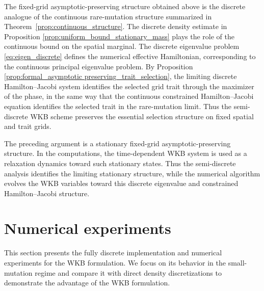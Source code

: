 \documentclass[11pt]{article}
\numberwithin{equation}{section}
\begin{document}
The fixed-grid asymptotic-preserving structure obtained above is the discrete analogue of the
continuous rare-mutation structure summarized in
Theorem~\ref{prop:continuous_structure}.  The discrete density estimate in Proposition \ref{prop:uniform_bound_stationary_mass}
plays the role of the continuous bound on the spatial marginal.  The discrete
eigenvalue problem \eqref{eq:eigen_discrete} defines the numerical effective Hamiltonian, corresponding
to the continuous principal eigenvalue problem.  
By Proposition \ref{prop:formal_asymptotic preserving_trait_selection}, the limiting discrete
Hamilton--Jacobi system identifies the selected grid trait through the maximizer
of the phase, in the same way that the continuous constrained
Hamilton--Jacobi equation identifies the selected trait in the rare-mutation
limit.  Thus the semi-discrete WKB scheme preserves the essential selection
structure on fixed spatial and trait grids.








The preceding argument is a stationary fixed-grid asymptotic-preserving structure.  In the
computations, the time-dependent WKB system is used as a relaxation dynamics
toward such stationary states.  Thus the semi-discrete analysis identifies the
limiting stationary structure, while the numerical algorithm evolves the WKB
variables toward this discrete eigenvalue and constrained Hamilton--Jacobi
structure.













\section{Numerical experiments}\label{sec:numerics}

This section presents the fully discrete implementation and numerical
experiments for the WKB formulation.  We focus on its behavior in the
small-mutation regime and compare it with direct density discretizations to
demonstrate the advantage of the WKB formulation.
\end{document}
